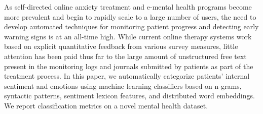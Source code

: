 As self-directed online anxiety treatment and e-mental health programs become more prevalent and begin to rapidly scale to a large number of users, the need to develop automated techniques for monitoring patient progress and detecting early warning signs is at an all-time high. While current online therapy systems work based on explicit quantitative feedback from various survey measures, little attention has been paid thus far to the large amount of unstructured free text present in the monitoring logs and journals submitted by patients as part of the treatment process. In this paper, we automatically categorize patients' internal sentiment and emotions using machine learning classifiers based on n-grams, syntactic patterns, sentiment lexicon features, and distributed word embeddings. We report classification metrics on a novel mental health dataset.
